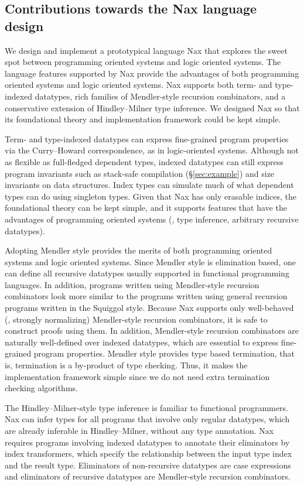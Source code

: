 \subsection{Contributions towards the Nax language design}
We design and implement a prototypical language Nax that explores
the sweet spot between programming oriented systems and logic oriented systems.
The language features supported by Nax provide the advantages
of both programming oriented systems and logic oriented systems.
Nax supports both term- and type-indexed datatypes,
rich families of Mendler-style recursion combinators,
and a conservative extension of Hindley--Milner type inference.
We designed Nax so that its foundational theory and
implementation framework could be kept simple.

Term- and type-indexed datatypes can express fine-grained program properties
via the Curry--Howard correspondence, as in logic-oriented systems. Although
not as flexible as full-fledged dependent types, indexed datatypes can
still express program invariants such as stack-safe compilation
(\S\ref{sec:example}) and size invariants on data structures.
Index types can simulate much of what dependent types can do using
singleton types. Given that Nax has only erasable indices,
the foundational theory can be kept simple, and it supports
features that have the advantages of programming oriented systems 
(\eg, type inference, arbitrary recursive datatypes).

Adopting Mendler style provides the merits of both programming oriented systems
and logic oriented systems. Since Mendler style is elimination based, one can
define all recursive datatypes usually supported in functional programming
languages. In addition, programs written using Mendler-style recursion
combinators look more similar to the programs written using general recursion
programs written in the Squiggol style. Because Nax supports only well-behaved
(\ie, strongly normalizing) Mendler-style recursion combinators, it is safe to
construct proofs using them. In addition, Mendler-style recursion combinators
are naturally well-defined over indexed datatypes, which are essential to
express fine-grained program properties. Mendler style provides type
based termination, that is, termination is a by-product of type checking.
Thus, it makes the implementation framework simple since we do not need
extra termination checking algorithms.

The Hindley--Milner-style type inference is familiar to functional programmers.
Nax can infer types for all programs that involve only regular datatypes,
which are already inferable in Hindley--Milner, without any type annotation.
Nax requires programs involving indexed datatypes to annotate their eliminators
by index transformers, which specify the relationship between the input type
index and the result type. Eliminators of non-recursive datatypes are
case expressions and eliminators of recursive datatypes are
Mendler-style recursion combinators.


